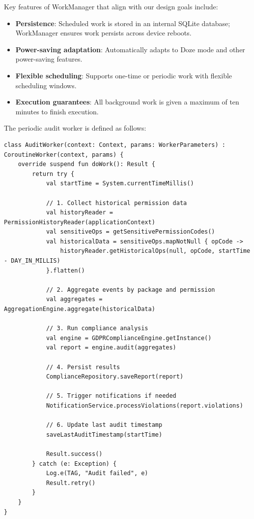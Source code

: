 Key features of WorkManager that align with our design goals include:
\begin{itemize}
\item \textbf{Persistence}: Scheduled work is stored in an internal SQLite database; WorkManager ensures work persists across device reboots.
\item \textbf{Power-saving adaptation}: Automatically adapts to Doze mode and other power-saving features.
\item \textbf{Flexible scheduling}: Supports one-time or periodic work with flexible scheduling windows.
\item \textbf{Execution guarantees}: All background work is given a maximum of ten minutes to finish execution.
\end{itemize}

The periodic audit worker is defined as follows:

\begin{lstlisting}[caption=Periodic audit worker definition]
class AuditWorker(context: Context, params: WorkerParameters) : CoroutineWorker(context, params) {
    override suspend fun doWork(): Result {
        return try {
            val startTime = System.currentTimeMillis()
            
            // 1. Collect historical permission data
            val historyReader = PermissionHistoryReader(applicationContext)
            val sensitiveOps = getSensitivePermissionCodes()
            val historicalData = sensitiveOps.mapNotNull { opCode ->
                historyReader.getHistoricalOps(null, opCode, startTime - DAY_IN_MILLIS)
            }.flatten()
            
            // 2. Aggregate events by package and permission
            val aggregates = AggregationEngine.aggregate(historicalData)
            
            // 3. Run compliance analysis
            val engine = GDPRComplianceEngine.getInstance()
            val report = engine.audit(aggregates)
            
            // 4. Persist results
            ComplianceRepository.saveReport(report)
            
            // 5. Trigger notifications if needed
            NotificationService.processViolations(report.violations)
            
            // 6. Update last audit timestamp
            saveLastAuditTimestamp(startTime)
            
            Result.success()
        } catch (e: Exception) {
            Log.e(TAG, "Audit failed", e)
            Result.retry()
        }
    }
}
\end{lstlisting}

